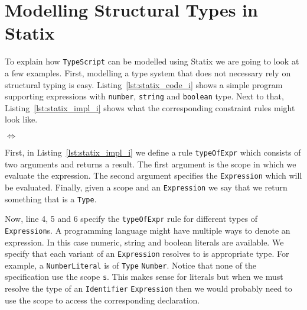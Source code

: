 \documentclass{article}
\newcommand{\ttt}[1]{\texttt{#1}}
\begin{document}
\section*{Modelling Structural Types in Statix}
To explain how \ttt{TypeScript} can be modelled using Statix we are going to look at a few examples.
First, modelling a type system that does not necessary rely on structural typing is easy.
Listing~\ref{lst:statix_code_i} shows a simple program supporting expressions with \ttt{number}, \ttt{string} and \ttt{boolean} type.
Next to that, Listing~\ref{lst:statix_impl_i} shows what the corresponding constraint rules might look like.

\noindent
\begin{minipage}{.45\textwidth}

\end{minipage}
\hfill$\Longleftrightarrow$\hfill\hfill\hfill
\begin{minipage}{.45\textwidth}

\end{minipage}
First, in Listing~\ref{lst:statix_impl_i} we define a rule \ttt{typeOfExpr} which consists of two arguments and returns a result.
The first argument is the scope in which we evaluate the expression.
The second argument specifies the \ttt{Expression} which will be evaluated.
Finally, given a scope and an \ttt{Expression} we say that we return something that is a \ttt{Type}.

Now, line 4, 5 and 6 specify the \ttt{typeOfExpr} rule for different types of \ttt{Expression}s.
A programming language might have multiple ways to denote an expression.
In this case numeric, string and boolean literals are available.
We specify that each variant of an \ttt{Expression} resolves to is appropriate type.
For example, a \ttt{NumberLiteral} is of \ttt{Type} \ttt{Number}.
Notice that none of the specification use the scope \ttt{s}.
This makes sense for literals but when we must resolve the type of an \ttt{Identifier} \ttt{Expression} then we would probably need to use the scope to access the corresponding declaration.



\end{document}
